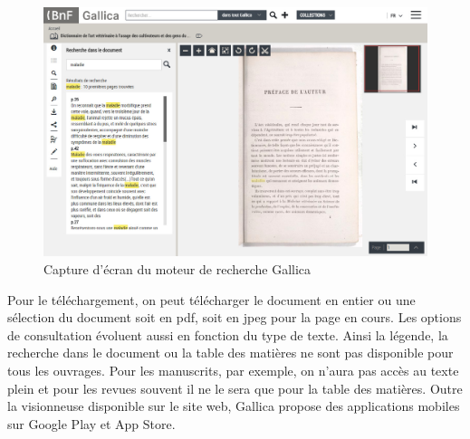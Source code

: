         \begin{figure}[ht!]
            \centering
            \includegraphics[width=1\textwidth]{figure/screenshot_gallica.jpg}
            \caption{Capture d'écran du moteur de recherche Gallica}
            \label{fig:gallica}
        \end{figure}

        Pour le téléchargement, on peut télécharger le document en entier ou une sélection du document soit en pdf, soit en jpeg
        pour la page en cours. Les options de consultation évoluent aussi en fonction du type de texte. Ainsi la légende,
        la recherche dans le document ou la table des matières ne sont pas disponible pour tous les ouvrages. Pour les manuscrits,
        par exemple, on n’aura pas accès au texte plein et pour les revues souvent il ne le sera que pour la table des matières.
        Outre la visionneuse disponible sur le site web, Gallica propose des applications mobiles sur Google Play et App Store.

